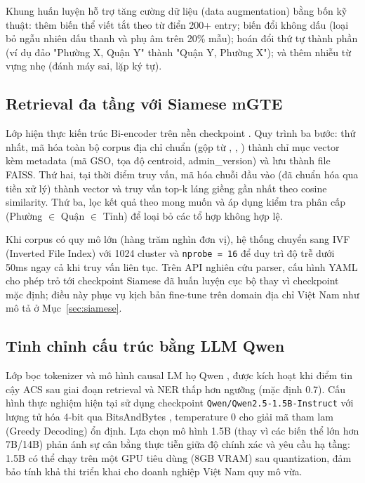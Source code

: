 Khung huấn luyện hỗ trợ tăng cường dữ liệu (data augmentation) bằng bốn kỹ thuật: thêm biến thể viết tắt theo từ điển 200+ entry; biến đổi không dấu (loại bỏ ngẫu nhiên dấu thanh và phụ âm trên 20\% mẫu); hoán đổi thứ tự thành phần (ví dụ đảo "Phường X, Quận Y" thành "Quận Y, Phường X"); và thêm nhiễu từ vựng nhẹ (đánh máy sai, lặp ký tự).

\subsection{Retrieval đa tầng với Siamese mGTE}
\label{sec:mgte-retrieval}

Lớp  hiện thực kiến trúc Bi-encoder trên nền checkpoint \allowbreak{} \cite{mgte2024}. Quy trình ba bước: thứ nhất, mã hóa toàn bộ corpus địa chỉ chuẩn (gộp từ , , ) thành chỉ mục vector kèm metadata (mã GSO, tọa độ centroid, admin\_version) và lưu thành file FAISS. Thứ hai, tại thời điểm truy vấn, mã hóa chuỗi đầu vào (đã chuẩn hóa qua tiền xử lý) thành vector và truy vấn top-k láng giềng gần nhất theo cosine similarity. Thứ ba, lọc kết quả theo  mong muốn và áp dụng kiểm tra phân cấp (Phường $\in$ Quận $\in$ Tỉnh) để loại bỏ các tổ hợp không hợp lệ.

Khi corpus có quy mô lớn (hàng trăm nghìn đơn vị), hệ thống chuyển sang IVF (Inverted File Index) với 1024 cluster và \texttt{nprobe = 16} để duy trì độ trễ dưới 50ms ngay cả khi truy vấn liên tục. Trên API nghiên cứu parser, cấu hình YAML cho phép trỏ tới checkpoint Siamese đã huấn luyện cục bộ thay vì checkpoint mặc định; điều này phục vụ kịch bản fine-tune trên domain địa chỉ Việt Nam như mô tả ở Mục~\ref{sec:siamese}.

\subsection{Tinh chỉnh cấu trúc bằng LLM Qwen}
\label{sec:llm-qwen}

Lớp  bọc tokenizer và mô hình causal LM họ Qwen \cite{QwenTeam2024}, được kích hoạt khi điểm tin cậy ACS sau giai đoạn retrieval và NER thấp hơn ngưỡng (mặc định 0.7). Cấu hình thực nghiệm hiện tại sử dụng checkpoint \texttt{Qwen/Qwen2.5-1.5B-Instruct} với lượng tử hóa 4-bit qua BitsAndBytes \cite{Dettmers2022BNB}, temperature 0 cho giải mã tham lam (Greedy Decoding) ổn định. Lựa chọn mô hình 1.5B (thay vì các biến thể lớn hơn 7B/14B) phản ánh sự cân bằng thực tiễn giữa độ chính xác và yêu cầu hạ tầng: 1.5B có thể chạy trên một GPU tiêu dùng (8GB VRAM) sau quantization, đảm bảo tính khả thi triển khai cho doanh nghiệp Việt Nam quy mô vừa.

